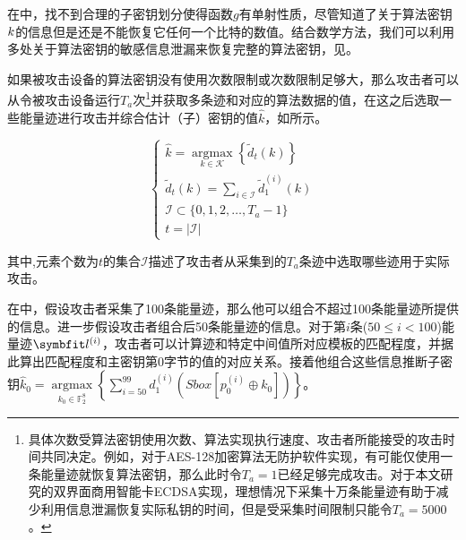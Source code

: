 {	\begin{example}
		在中，找不到合理的子密钥划分使得函数$g$有单射性质，尽管知道了关于算法密钥$k$的信息但是还是不能恢复它任何一个比特的数值。结合数学方法，我们可以利用多处关于算法密钥的敏感信息泄漏来恢复完整的算法密钥，见。
	\end{example}
	
	如果被攻击设备的算法密钥没有使用次数限制或次数限制足够大，那么攻击者可以从令被攻击设备运行$T_a$次\footnote{具体次数受算法密钥使用次数、算法实现执行速度、攻击者所能接受的攻击时间共同决定。例如，对于AES-128加密算法无防护软件实现，有可能仅使用一条能量迹就恢复算法密钥，那么此时令$T_a=1$已经足够完成攻击。对于本文研究的双界面商用智能卡ECDSA实现，理想情况下采集十万条能量迹有助于减少利用信息泄漏恢复实际私钥的时间，但是受采集时间限制只能令$T_a=5000$。}并获取多条迹和对应的算法数据的值，在这之后选取一些能量迹进行攻击并综合估计（子）密钥的值$\hat k$，如所示。
	
	\begin{equation}\label{eq:ttracek}
		\begin{cases}
			\hat k=\mathop{\mathrm{argmax}}\limits_{k\in\mathcal K}\left\lbrace \tilde d_t(k)\right\rbrace \\
			\tilde d_t(k)=\sum\limits_{i\in \mathcal I}\tilde d^{(i)}_1(k)\\
			\mathcal I\subset \{0,1,2,\dots,T_a-1\}\\
			t=\vert\mathcal I\vert
		\end{cases}
	\end{equation}
	
	\noindent 其中,元素个数为$t$的集合$\mathcal I$描述了攻击者从采集到的$T_a$条迹中选取哪些迹用于实际攻击。
	
	\begin{example}
		在中，假设攻击者采集了100条能量迹，那么他可以组合不超过100条能量迹所提供的信息。进一步假设攻击者组合后50条能量迹的信息。对于第$i$条($50\le i<100$)能量迹$\Vector {l^{(i)}}$，攻击者可以计算迹和特定中间值所对应模板的匹配程度，并据此算出匹配程度和主密钥第0字节的值的对应关系。接着他组合这些信息推断子密钥$\hat k_0=\mathop{\mathrm{argmax}}\limits_{k_0\in\mathbb F_2^8}\left\lbrace \sum\limits_{i=50}^{99}d_1^{(i)}\left( Sbox[p^{(i)}_0\oplus k_0]\right)\right\rbrace $。
	\end{example}
	
}
